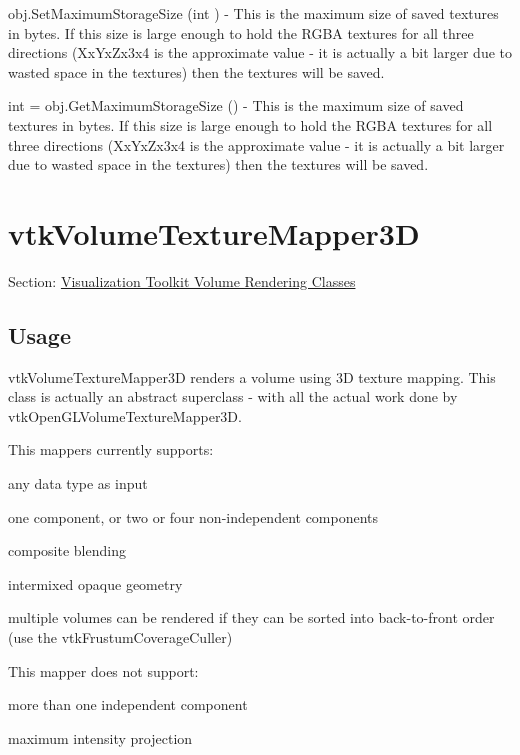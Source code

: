 \begin{DoxyItemize}
\item {\ttfamily obj.\-Set\-Maximum\-Storage\-Size (int )} -\/ This is the maximum size of saved textures in bytes. If this size is large enough to hold the R\-G\-B\-A textures for all three directions (Xx\-Yx\-Zx3x4 is the approximate value -\/ it is actually a bit larger due to wasted space in the textures) then the textures will be saved.  
\item {\ttfamily int = obj.\-Get\-Maximum\-Storage\-Size ()} -\/ This is the maximum size of saved textures in bytes. If this size is large enough to hold the R\-G\-B\-A textures for all three directions (Xx\-Yx\-Zx3x4 is the approximate value -\/ it is actually a bit larger due to wasted space in the textures) then the textures will be saved.  
\end{DoxyItemize}\hypertarget{vtkvolumerendering_vtkvolumetexturemapper3d}{}\section{vtk\-Volume\-Texture\-Mapper3\-D}\label{vtkvolumerendering_vtkvolumetexturemapper3d}
Section\-: \hyperlink{sec_vtkvolumerendering}{Visualization Toolkit Volume Rendering Classes} \hypertarget{vtkwidgets_vtkxyplotwidget_Usage}{}\subsection{Usage}\label{vtkwidgets_vtkxyplotwidget_Usage}
vtk\-Volume\-Texture\-Mapper3\-D renders a volume using 3\-D texture mapping. This class is actually an abstract superclass -\/ with all the actual work done by vtk\-Open\-G\-L\-Volume\-Texture\-Mapper3\-D.

This mappers currently supports\-:


\begin{DoxyItemize}
\item any data type as input
\item one component, or two or four non-\/independent components
\item composite blending
\item intermixed opaque geometry
\item multiple volumes can be rendered if they can be sorted into back-\/to-\/front order (use the vtk\-Frustum\-Coverage\-Culler)
\end{DoxyItemize}

This mapper does not support\-:
\begin{DoxyItemize}
\item more than one independent component
\item maximum intensity projection
\end{DoxyItemize}

